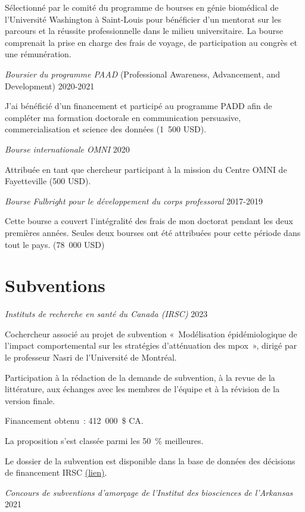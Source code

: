 \documentclass[10pt,]{article}
\begin{document}
Sélectionné par le comité du programme de bourses en génie biomédical de
l'Université Washington à Saint-Louis pour bénéficier d'un mentorat sur
les parcours et la réussite professionnelle dans le milieu
universitaire. La bourse comprenait la prise en charge des frais de
voyage, de participation au congrès et une rémunération.

\emph{Boursier du programme PAAD} (Professional Awareness, Advancement,
and Development) \hfill 2020-2021

J'ai bénéficié d'un financement et participé au programme PADD afin de
compléter ma formation doctorale en communication persuasive,
commercialisation et science des données (1~500 USD).

\emph{Bourse internationale OMNI} \hfill 2020

Attribuée en tant que chercheur participant à la mission du Centre OMNI
de Fayetteville (500 USD).

\emph{Bourse Fulbright pour le développement du corps professoral}
\hfill 2017-2019

Cette bourse a couvert l'intégralité des frais de mon doctorat pendant
les deux premières années. Seules deux bourses ont été attribuées pour
cette période dans tout le pays. (78~000 USD)

\section{Subventions}\label{subventions}

\emph{Instituts de recherche en santé du Canada (IRSC)} \hfill 2023

Cochercheur associé au projet de subvention «~Modélisation
épidémiologique de l'impact comportemental sur les stratégies
d'atténuation des mpox~», dirigé par le professeur Nasri de l'Université
de Montréal.

Participation à la rédaction de la demande de subvention, à la revue de
la littérature, aux échanges avec les membres de l'équipe et à la
révision de la version finale.

Financement obtenu~: 412~000~\$ CA.

La proposition s'est classée parmi les 50~\% meilleures.

Le dossier de la subvention est disponible dans la base de données des
décisions de financement IRSC
\href{https://webapps.cihr-irsc.gc.ca/decisions/p/project_details.html?applId=481271&lang=en}{(lien)}.

\emph{Concours de subventions d'amorçage de l'Institut des biosciences
de l'Arkansas} \hfill 2021
\end{document}
